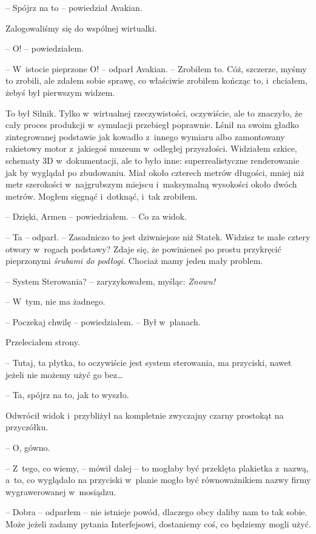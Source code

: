 \documentclass[oneside,polish,12pt,sfheadings]{mwbk}
\begin{document}
-- Spójrz na to -- powiedział Avakian.

Zalogowaliśmy się do wspólnej wirtualki.

-- O! -- powiedziałem.

-- W~istocie pieprzone O! -- odparł Avakian. -- Zrobiłem to. Cóż, szczerze,
myśmy to zrobili, ale zdałem sobie sprawę, co właściwie zrobiłem kończąc
to, i~chciałem, żebyś był pierwszym widzem.

To był Silnik. Tylko w~wirtualnej rzeczywistości, oczywiście, ale to
znaczyło, że cały proces produkcji w~symulacji przebiegł poprawnie.
Lśnił na swoim gładko zintegrowanej podstawie jak kowadło z~innego
wymiaru albo zamontowany rakietowy motor z~jakiegoś muzeum w~odległej
przyszłości. Widziałem szkice, schematy 3D w~dokumentacji, ale to było
inne: superrealistyczne renderowanie jak by wyglądał po zbudowaniu. Miał
około czterech metrów długości, mniej niż metr szerokości w~najgrubszym
miejscu i~maksymalną wysokości około dwóch metrów. Mogłem sięgnąć i~dotknąć, i~tak zrobiłem.

-- Dzięki, Armen -- powiedziałem. -- Co za widok.

-- Ta -- odparł. -- Zasadniczo to jest dziwniejsze niż Statek. Widzisz te
małe cztery otwory w~rogach podstawy? Zdaje się, że powinieneś po prostu
przykręcić pieprzonymi \emph{śrubami do podłogi. } Chociaż mamy jeden
mały problem.

-- System Sterowania? -- zaryzykowałem, myśląc: \emph{Znowu!}

-- W~tym, nie ma żadnego.

-- Poczekaj chwilę -- powiedziałem. -- Był w~planach.

Przeleciałem strony. 

-- Tutaj, ta płytka, to oczywiście jest system
sterowania, ma przyciski, nawet jeżeli nie możemy użyć go bez\ldots

-- Ta, spójrz na to, jak to wyszło.

Odwrócił widok i~przybliżył na kompletnie zwyczajny czarny prostokąt na
przyczółku.

-- O, gówno.

-- Z~tego, co wiemy, -- mówił dalej -- to mogłaby być przeklęta plakietka z~nazwą, a~to, co wyglądało na przyciski w~planie mogło być równoważnikiem
nazwy firmy wygrawerowanej w~mosiądzu.

-- Dobra -- odparłem -- nie istnieje powód, dlaczego obcy daliby nam to tak
sobie. Może jeżeli zadamy pytania Interfejsowi, dostaniemy coś, co
będziemy mogli użyć.
\end{document}
